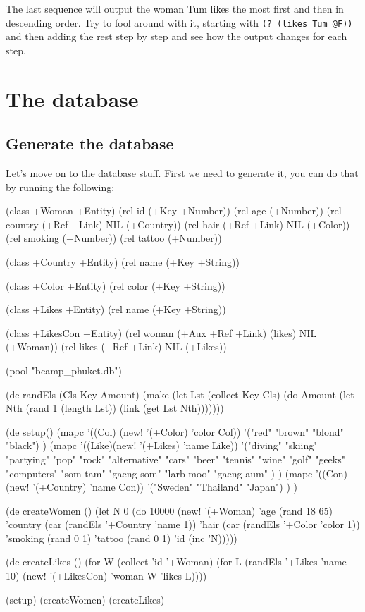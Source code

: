 The last sequence will output the woman Tum likes the most first and
then in descending order. Try to fool around with it, starting with
\texttt{(? (likes Tum @F))} and then adding the rest step by step and
see how the output changes for each step.

\section{The database}
\label{sec:prolog-dat-aid-the-database}


\subsection{Generate the database}
\label{sec:prolog-dat-aid-generate-the-database}

Let's move on to the database stuff. First we need to generate it, you
can do that by running the following:


\begin{wideverbatim}
(class +Woman +Entity)
(rel id       (+Key +Number))
(rel age      (+Number))
(rel country  (+Ref +Link) NIL (+Country))
(rel hair     (+Ref +Link) NIL (+Color))
(rel smoking  (+Number))
(rel tattoo   (+Number))

(class +Country +Entity)
(rel name (+Key +String))

(class +Color +Entity)
(rel color (+Key +String))

(class +Likes +Entity)
(rel name  (+Key +String))

(class +LikesCon +Entity)
(rel woman  (+Aux +Ref +Link) (likes) NIL (+Woman))
(rel likes  (+Ref +Link) NIL (+Likes))
 
(pool "bcamp_phuket.db")

(de randEls (Cls Key Amount)
   (make 
      (let Lst (collect Key Cls)         
         (do Amount
            (let Nth (rand 1 (length Lst))               
               (link (get Lst Nth)))))))
    
\end{wideverbatim}

\begin{wideverbatim}

(de setup()
   (mapc '((Col) (new!  '(+Color)   'color Col))
      '("red" "brown" "blond" "black") )
   (mapc '((Like)(new!  '(+Likes)   'name Like))
      '("diving" "skiing" "partying" "pop" "rock" "alternative" "cars"
          "beer" "tennis" "wine" "golf" "geeks" "computers" "som tam"
          "gaeng som" "larb moo" "gaeng aum" ) )
   (mapc '((Con) (new!  '(+Country) 'name Con))
      '("Sweden" "Thailand" "Japan") ) )

(de createWomen ()
   (let N 0 
      (do 10000
         (new! '(+Woman) 
            'age (rand 18 65)
            'country (car (randEls '+Country 'name 1))
            'hair (car (randEls '+Color 'color 1))
            'smoking (rand 0 1)
            'tattoo (rand 0 1)
            'id (inc 'N)))))
    
(de createLikes ()
   (for W (collect 'id '+Woman)
      (for L (randEls '+Likes 'name 10)
         (new! '(+LikesCon) 'woman W 'likes L))))
    
(setup)
(createWomen)
(createLikes)
\end{wideverbatim}

